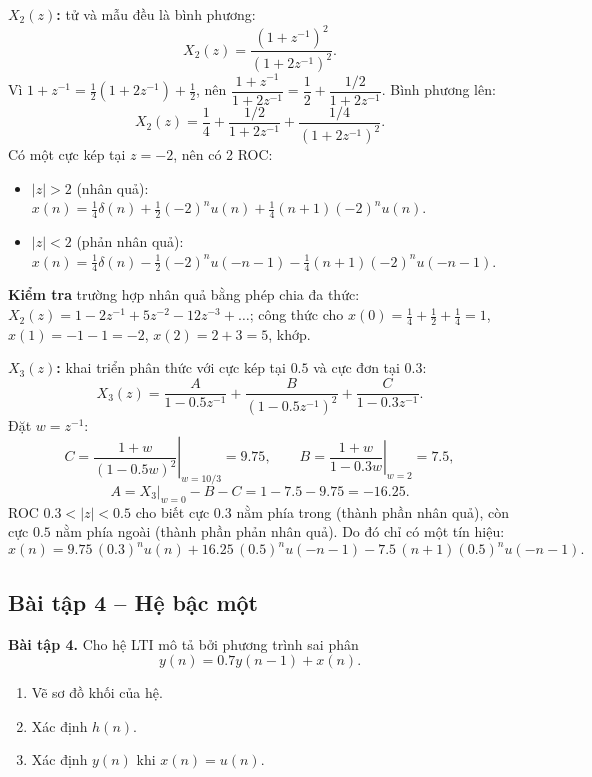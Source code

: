\documentclass[12pt,a4paper]{article}
\begin{document}
\textbf{$X_2(z)$:} tử và mẫu đều là bình phương:
\[
    X_2(z) = \frac{(1 + z^{-1})^2}{(1 + 2z^{-1})^2}.
\]
Vì $1 + z^{-1} = \frac{1}{2}(1 + 2z^{-1}) + \frac{1}{2}$, nên $\dfrac{1 + z^{-1}}{1 + 2z^{-1}} = \dfrac{1}{2} + \dfrac{1/2}{1 + 2z^{-1}}$. Bình phương lên:
\[
    X_2(z) = \frac{1}{4} + \frac{1/2}{1 + 2z^{-1}} + \frac{1/4}{(1 + 2z^{-1})^2}.
\]
Có một cực kép tại $z = -2$, nên có 2 ROC:
\begin{itemize}
    \item $|z| > 2$ (nhân quả): $x(n) = \frac{1}{4}\delta(n) + \frac{1}{2}(-2)^n u(n) + \frac{1}{4}(n+1)(-2)^n u(n)$.
    \item $|z| < 2$ (phản nhân quả): $x(n) = \frac{1}{4}\delta(n) - \frac{1}{2}(-2)^n u(-n-1) - \frac{1}{4}(n+1)(-2)^n u(-n-1)$.
\end{itemize}
\textbf{Kiểm tra} trường hợp nhân quả bằng phép chia đa thức: $X_2(z) = 1 - 2z^{-1} + 5z^{-2} - 12z^{-3} + \dots$; công thức cho $x(0) = \frac{1}{4} + \frac{1}{2} + \frac{1}{4} = 1$, $x(1) = -1 - 1 = -2$, $x(2) = 2 + 3 = 5$, khớp.

\textbf{$X_3(z)$:} khai triển phân thức với cực kép tại $0.5$ và cực đơn tại $0.3$:
\[
    X_3(z) = \frac{A}{1 - 0.5z^{-1}} + \frac{B}{(1 - 0.5z^{-1})^2} + \frac{C}{1 - 0.3z^{-1}}.
\]
Đặt $w = z^{-1}$:
\[
    C = \left.\frac{1 + w}{(1 - 0.5w)^2}\right|_{w = 10/3} = 9.75,
    \qquad
    B = \left.\frac{1 + w}{1 - 0.3w}\right|_{w = 2} = 7.5,
\]
\[
    A = X_3\big|_{w=0} - B - C = 1 - 7.5 - 9.75 = -16.25.
\]
ROC $0.3 < |z| < 0.5$ cho biết cực $0.3$ nằm phía trong (thành phần nhân quả), còn cực $0.5$ nằm phía ngoài (thành phần phản nhân quả). Do đó chỉ có một tín hiệu:
\begin{equation}
    x(n) = 9.75\,(0.3)^n u(n) + 16.25\,(0.5)^n u(-n-1) - 7.5\,(n+1)(0.5)^n u(-n-1).
\end{equation}

\subsection{Bài tập 4 -- Hệ bậc một}
\begin{mdframed}[style=exbox]
\noindent\textbf{Bài tập 4.} Cho hệ LTI mô tả bởi phương trình sai phân
\[
    y(n) = 0.7 y(n-1) + x(n).
\]
\begin{enumerate}
    \item[a.] Vẽ sơ đồ khối của hệ.
    \item[b.] Xác định $h(n)$.
    \item[c.] Xác định $y(n)$ khi $x(n) = u(n)$.
\end{enumerate}
\end{mdframed}
\end{document}

